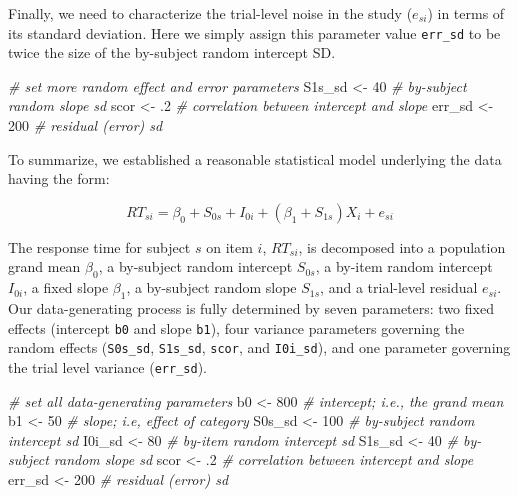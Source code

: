 \documentclass[doc,floatsintext]{apa6}
\newenvironment{Shaded}{\begin{snugshade}}{\end{snugshade}}
\newcommand{\CommentTok}[1]{\textcolor[rgb]{0.56,0.35,0.01}{\textit{#1}}}
\newcommand{\DecValTok}[1]{\textcolor[rgb]{0.00,0.00,0.81}{#1}}
\newcommand{\FloatTok}[1]{\textcolor[rgb]{0.00,0.00,0.81}{#1}}
\newcommand{\NormalTok}[1]{#1}
\newcommand{\StringTok}[1]{\textcolor[rgb]{0.31,0.60,0.02}{#1}}
\begin{document}
Finally, we need to characterize the trial-level noise in the study (\(e_{si}\)) in terms of its standard deviation. Here we simply assign this parameter value \texttt{err\_sd} to be twice the size of the by-subject random intercept SD.

\begin{Shaded}
\begin{Highlighting}[]
\CommentTok{# set more random effect and error parameters}
\NormalTok{S1s_sd <-}\StringTok{  }\DecValTok{40} \CommentTok{# by-subject random slope sd}
\NormalTok{scor   <-}\StringTok{  }\FloatTok{.2} \CommentTok{# correlation between intercept and slope}
\NormalTok{err_sd <-}\StringTok{ }\DecValTok{200} \CommentTok{# residual (error) sd}
\end{Highlighting}
\end{Shaded}

To summarize, we established a reasonable statistical model underlying the data having the form:

\begin{equation}
RT_{si} = \beta_0 + S_{0s} + I_{0i} + \left(\beta_1 + S_{1s}\right) X_i + e_{si}
\end{equation}

\noindent The response time for subject \(s\) on item \(i\), \(RT_{si}\), is decomposed into a population grand mean \(\beta_0\), a by-subject random intercept \(S_{0s}\), a by-item random intercept \(I_{0i}\), a fixed slope \(\beta_1\), a by-subject random slope \(S_{1s}\), and a trial-level residual \(e_{si}\). Our data-generating process is fully determined by seven parameters: two fixed effects (intercept \texttt{b0} and slope \texttt{b1}), four variance parameters governing the random effects (\texttt{S0s\_sd}, \texttt{S1s\_sd}, \texttt{scor}, and \texttt{I0i\_sd}), and one parameter governing the trial level variance (\texttt{err\_sd}).

\begin{Shaded}
\begin{Highlighting}[]
\CommentTok{# set all data-generating parameters}
\NormalTok{b0     <-}\StringTok{ }\DecValTok{800} \CommentTok{# intercept; i.e., the grand mean}
\NormalTok{b1     <-}\StringTok{  }\DecValTok{50} \CommentTok{# slope; i.e, effect of category}
\NormalTok{S0s_sd <-}\StringTok{ }\DecValTok{100} \CommentTok{# by-subject random intercept sd}
\NormalTok{I0i_sd <-}\StringTok{  }\DecValTok{80} \CommentTok{# by-item random intercept sd}
\NormalTok{S1s_sd <-}\StringTok{  }\DecValTok{40} \CommentTok{# by-subject random slope sd}
\NormalTok{scor   <-}\StringTok{  }\FloatTok{.2} \CommentTok{# correlation between intercept and slope}
\NormalTok{err_sd <-}\StringTok{ }\DecValTok{200} \CommentTok{# residual (error) sd}
\end{Highlighting}
\end{Shaded}
\end{document}

